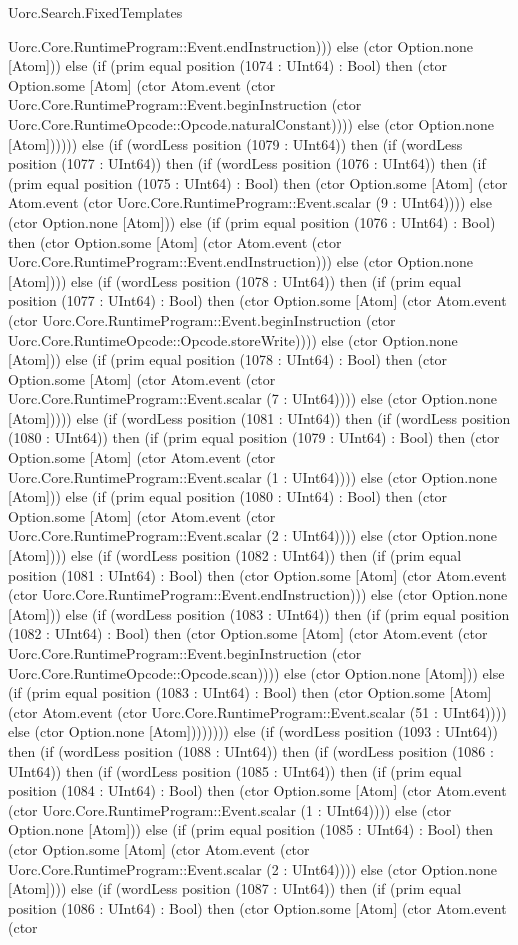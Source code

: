 \begin{lexlean}{Uorc.Search.FixedTemplates}
\begin{semanticmodule}
{Uorc.Core.RuntimeProgram::Event.endInstruction))) else (ctor Option.none [Atom])) else (if (prim equal position (1074 : UInt64) : Bool) then (ctor Option.some [Atom] (ctor Atom.event (ctor Uorc.Core.RuntimeProgram::Event.beginInstruction (ctor Uorc.Core.RuntimeOpcode::Opcode.naturalConstant)))) else (ctor Option.none [Atom]))))) else (if (wordLess position (1079 : UInt64)) then (if (wordLess position (1077 : UInt64)) then (if (wordLess position (1076 : UInt64)) then (if (prim equal position (1075 : UInt64) : Bool) then (ctor Option.some [Atom] (ctor Atom.event (ctor Uorc.Core.RuntimeProgram::Event.scalar (9 : UInt64)))) else (ctor Option.none [Atom])) else (if (prim equal position (1076 : UInt64) : Bool) then (ctor Option.some [Atom] (ctor Atom.event (ctor Uorc.Core.RuntimeProgram::Event.endInstruction))) else (ctor Option.none [Atom]))) else (if (wordLess position (1078 : UInt64)) then (if (prim equal position (1077 : UInt64) : Bool) then (ctor Option.some [Atom] (ctor Atom.event (ctor Uorc.Core.RuntimeProgram::Event.beginInstruction (ctor Uorc.Core.RuntimeOpcode::Opcode.storeWrite)))) else (ctor Option.none [Atom])) else (if (prim equal position (1078 : UInt64) : Bool) then (ctor Option.some [Atom] (ctor Atom.event (ctor Uorc.Core.RuntimeProgram::Event.scalar (7 : UInt64)))) else (ctor Option.none [Atom])))) else (if (wordLess position (1081 : UInt64)) then (if (wordLess position (1080 : UInt64)) then (if (prim equal position (1079 : UInt64) : Bool) then (ctor Option.some [Atom] (ctor Atom.event (ctor Uorc.Core.RuntimeProgram::Event.scalar (1 : UInt64)))) else (ctor Option.none [Atom])) else (if (prim equal position (1080 : UInt64) : Bool) then (ctor Option.some [Atom] (ctor Atom.event (ctor Uorc.Core.RuntimeProgram::Event.scalar (2 : UInt64)))) else (ctor Option.none [Atom]))) else (if (wordLess position (1082 : UInt64)) then (if (prim equal position (1081 : UInt64) : Bool) then (ctor Option.some [Atom] (ctor Atom.event (ctor Uorc.Core.RuntimeProgram::Event.endInstruction))) else (ctor Option.none [Atom])) else (if (wordLess position (1083 : UInt64)) then (if (prim equal position (1082 : UInt64) : Bool) then (ctor Option.some [Atom] (ctor Atom.event (ctor Uorc.Core.RuntimeProgram::Event.beginInstruction (ctor Uorc.Core.RuntimeOpcode::Opcode.scan)))) else (ctor Option.none [Atom])) else (if (prim equal position (1083 : UInt64) : Bool) then (ctor Option.some [Atom] (ctor Atom.event (ctor Uorc.Core.RuntimeProgram::Event.scalar (51 : UInt64)))) else (ctor Option.none [Atom]))))))) else (if (wordLess position (1093 : UInt64)) then (if (wordLess position (1088 : UInt64)) then (if (wordLess position (1086 : UInt64)) then (if (wordLess position (1085 : UInt64)) then (if (prim equal position (1084 : UInt64) : Bool) then (ctor Option.some [Atom] (ctor Atom.event (ctor Uorc.Core.RuntimeProgram::Event.scalar (1 : UInt64)))) else (ctor Option.none [Atom])) else (if (prim equal position (1085 : UInt64) : Bool) then (ctor Option.some [Atom] (ctor Atom.event (ctor Uorc.Core.RuntimeProgram::Event.scalar (2 : UInt64)))) else (ctor Option.none [Atom]))) else (if (wordLess position (1087 : UInt64)) then (if (prim equal position (1086 : UInt64) : Bool) then (ctor Option.some [Atom] (ctor Atom.event (ctor }
\end{semanticmodule}
\end{lexlean}

